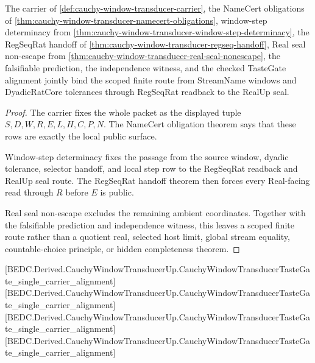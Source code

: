 \begin{theorem}
\label{thm:cauchy-window-transducer-scoped-closure-package}
The carrier of \autoref{def:cauchy-window-transducer-carrier}, the NameCert obligations of \autoref{thm:cauchy-window-transducer-namecert-obligations}, window-step determinacy from \autoref{thm:cauchy-window-transducer-window-step-determinacy}, the RegSeqRat handoff of \autoref{thm:cauchy-window-transducer-regseq-handoff}, Real seal non-escape from \autoref{thm:cauchy-window-transducer-real-seal-nonescape}, the falsifiable prediction, the independence witness, and the checked TasteGate alignment jointly bind the scoped finite route from StreamName windows and DyadicRatCore tolerances through RegSeqRat readback to the RealUp seal.
\end{theorem}
\begin{proof}
The carrier fixes the whole packet as the displayed tuple $S,D,W,R,E,L,H,C,P,N$. The NameCert obligation theorem says that these rows are exactly the local public surface.

Window-step determinacy fixes the passage from the source window, dyadic tolerance, selector handoff, and local step row to the RegSeqRat readback and RealUp seal route. The RegSeqRat handoff theorem then forces every Real-facing read through $R$ before $E$ is public.

Real seal non-escape excludes the remaining ambient coordinates. Together with the falsifiable prediction and independence witness, this leaves a scoped finite route rather than a quotient real, selected host limit, global stream equality, countable-choice principle, or hidden completeness theorem.
\end{proof}

[BEDC.Derived.CauchyWindowTransducerUp.CauchyWindowTransducerTasteGate\_single\_carrier\_alignment]
[BEDC.Derived.CauchyWindowTransducerUp.CauchyWindowTransducerTasteGate\_single\_carrier\_alignment]
[BEDC.Derived.CauchyWindowTransducerUp.CauchyWindowTransducerTasteGate\_single\_carrier\_alignment]
[BEDC.Derived.CauchyWindowTransducerUp.CauchyWindowTransducerTasteGate\_single\_carrier\_alignment]

